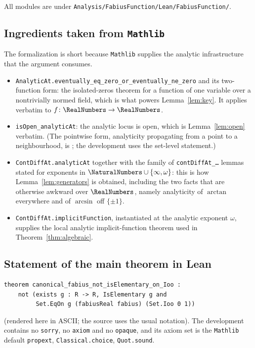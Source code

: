 \documentclass[11pt,oneside]{article}
\theoremstyle{definition}
\theoremstyle{remark}
\newcommand{\repo}{\nolinkurl{Analysis/FabiusFunction}}
\begin{document}
All modules are under \texttt{\repo/Lean/FabiusFunction/}.

\subsection{Ingredients taken from \texttt{Mathlib}}

The formalization is short because \texttt{Mathlib} supplies the analytic
infrastructure that the argument consumes.

\begin{itemize}
\item \texttt{AnalyticAt.eventually\_eq\_zero\_or\_eventually\_ne\_zero} and
      its two-function form: the isolated-zeros theorem for a function of one
      variable over a nontrivially normed field, which is what powers
      Lemma~\ref{lem:key}.  It applies verbatim to $f\colon\RealNumbers\to\RealNumbers$.
\item \texttt{isOpen\_analyticAt}: the analytic locus is open, which is
      Lemma~\ref{lem:open} verbatim.  (The pointwise form, analyticity propagating
      from a point to a neighbourhood, is
      ; the development uses the
      set-level statement.)
\item \texttt{ContDiffAt.analyticAt} together with the family of
      \texttt{contDiffAt\_\ldots} lemmas stated for exponents in
      $\NaturalNumbers\cup\{\infty,\omega\}$: this is how Lemma~\ref{lem:generators} is
      obtained, including the two facts that are otherwise awkward over $\RealNumbers$,
      namely analyticity of $\arctan$ everywhere and of $\arcsin$ off
      $\{\pm1\}$.
\item \texttt{ContDiffAt.implicitFunction}, instantiated at the analytic
      exponent $\omega$, supplies the local analytic implicit-function theorem
      used in Theorem~\ref{thm:algebraic}.
\end{itemize}

\subsection{Statement of the main theorem in Lean}

\begin{lstlisting}[style=pseudo]
theorem canonical_fabius_not_isElementary_on_Ioo :
    not (exists g : R -> R, IsElementary g and
         Set.EqOn g (fabiusReal fabius) (Set.Ioo 0 1))
\end{lstlisting}

\noindent (rendered here in ASCII; the source uses the usual notation).  The
development contains no \texttt{sorry}, no \texttt{axiom} and no
\texttt{opaque}, and its axiom set is the \texttt{Mathlib} default
\texttt{propext}, \texttt{Classical.choice}, \texttt{Quot.sound}.
\end{document}
